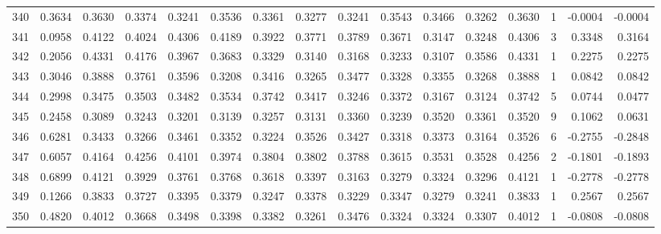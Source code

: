 \begin{tabular}{lrrrrrrrrrrrrrrr}
340 &      0.3634 &  0.3630 &  0.3374 &  0.3241 &  0.3536 &  0.3361 &  0.3277 &  0.3241 &  0.3543 &  0.3466 &   0.3262 &     0.3630 &      1 &                   -0.0004 &                    -0.0004 \\
341 &      0.0958 &  0.4122 &  0.4024 &  0.4306 &  0.4189 &  0.3922 &  0.3771 &  0.3789 &  0.3671 &  0.3147 &   0.3248 &     0.4306 &      3 &                    0.3348 &                     0.3164 \\
342 &      0.2056 &  0.4331 &  0.4176 &  0.3967 &  0.3683 &  0.3329 &  0.3140 &  0.3168 &  0.3233 &  0.3107 &   0.3586 &     0.4331 &      1 &                    0.2275 &                     0.2275 \\
343 &      0.3046 &  0.3888 &  0.3761 &  0.3596 &  0.3208 &  0.3416 &  0.3265 &  0.3477 &  0.3328 &  0.3355 &   0.3268 &     0.3888 &      1 &                    0.0842 &                     0.0842 \\
344 &      0.2998 &  0.3475 &  0.3503 &  0.3482 &  0.3534 &  0.3742 &  0.3417 &  0.3246 &  0.3372 &  0.3167 &   0.3124 &     0.3742 &      5 &                    0.0744 &                     0.0477 \\
345 &      0.2458 &  0.3089 &  0.3243 &  0.3201 &  0.3139 &  0.3257 &  0.3131 &  0.3360 &  0.3239 &  0.3520 &   0.3361 &     0.3520 &      9 &                    0.1062 &                     0.0631 \\
346 &      0.6281 &  0.3433 &  0.3266 &  0.3461 &  0.3352 &  0.3224 &  0.3526 &  0.3427 &  0.3318 &  0.3373 &   0.3164 &     0.3526 &      6 &                   -0.2755 &                    -0.2848 \\
347 &      0.6057 &  0.4164 &  0.4256 &  0.4101 &  0.3974 &  0.3804 &  0.3802 &  0.3788 &  0.3615 &  0.3531 &   0.3528 &     0.4256 &      2 &                   -0.1801 &                    -0.1893 \\
348 &      0.6899 &  0.4121 &  0.3929 &  0.3761 &  0.3768 &  0.3618 &  0.3397 &  0.3163 &  0.3279 &  0.3324 &   0.3296 &     0.4121 &      1 &                   -0.2778 &                    -0.2778 \\
349 &      0.1266 &  0.3833 &  0.3727 &  0.3395 &  0.3379 &  0.3247 &  0.3378 &  0.3229 &  0.3347 &  0.3279 &   0.3241 &     0.3833 &      1 &                    0.2567 &                     0.2567 \\
350 &      0.4820 &  0.4012 &  0.3668 &  0.3498 &  0.3398 &  0.3382 &  0.3261 &  0.3476 &  0.3324 &  0.3324 &   0.3307 &     0.4012 &      1 &                   -0.0808 &                    -0.0808 \\

\end{tabular}
